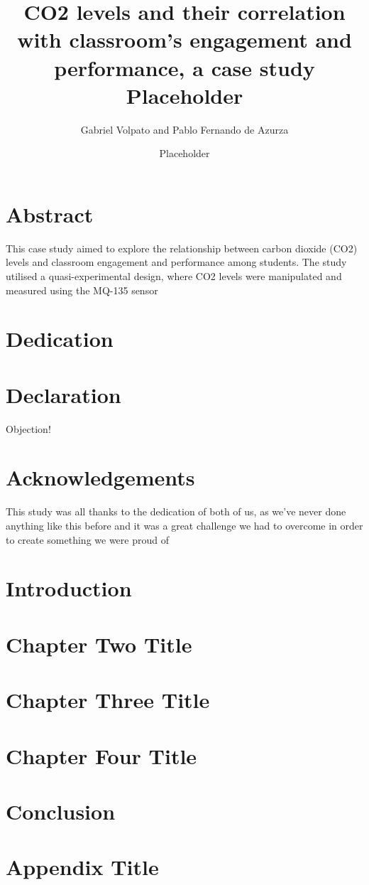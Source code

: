 \documentclass[12pt]{report}
\title{
{CO2 levels and their correlation with classroom's engagement and performance, a case study}\\
{\large Placeholder}\\
}
\author{Gabriel Volpato and Pablo Fernando de Azurza}
\date{Placeholder}
\begin{document}
\maketitle

\chapter*{Abstract}
This case study aimed to explore the relationship between carbon dioxide (CO2) levels and classroom engagement and performance among students. The study utilised a quasi-experimental design, where CO2 levels were manipulated and measured using the MQ-135 sensor

\chapter*{Dedication}


\chapter*{Declaration}
Objection!

\chapter*{Acknowledgements}
This study was all thanks to the dedication of both of us, as we've never done anything like this before and it was a great challenge we had to overcome in order to create something we were proud of

\tableofcontents

\chapter{Introduction}


\chapter{Chapter Two Title}


\chapter{Chapter Three Title}


\chapter{Chapter Four Title}


\chapter{Conclusion}


\appendix
\chapter{Appendix Title}

\end{document}
